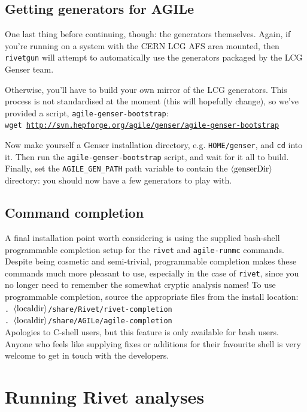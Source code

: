 \documentclass{JHEP3}
\newcommand{\kbd}[1]{\texttt{#1}\xspace}
\newcommand{\inp}[1]{\textsf{\textdollar}\hspace{1mm}\texttt{#1}\xspace}
\newcommand{\var}[1]{\texttt{\textdollar{}#1}\xspace}
\newcommand{\val}[1]{\textit{\ensuremath{\langle\text{\textrm{#1}\/}\rangle}}\xspace}
\begin{document}
\subsection{Getting generators for AGILe}
\label{sec:genser}

One last thing before continuing, though: the generators themselves. Again, if
you're running on a system with the CERN LCG AFS area mounted, then
\kbd{rivetgun} will attempt to automatically use the generators packaged by the
LCG Genser team.

Otherwise, you'll have to build your own mirror of the LCG generators. This
process is not standardised at the moment (this will hopefully
change), so we've provided a script, \kbd{agile-genser-bootstrap}:\\
\inp{wget \url{http://svn.hepforge.org/agile/genser/agile-genser-bootstrap}}

Now make yourself a Genser installation directory, e.g. \kbd{\var{HOME}/genser},
and \kbd{cd} into it. Then run the \kbd{agile-genser-bootstrap} script, and wait
for it all to build. Finally, set the \var{AGILE_GEN_PATH} path variable to
contain the \kbd{\val{genserDir}} directory: you should now have a few
generators to play with.


\subsection{Command completion}

A final installation point worth considering is using the supplied bash-shell
programmable completion setup for the \kbd{rivet} and \kbd{agile-runmc}
commands. Despite being cosmetic and semi-trivial, programmable completion makes
these commands much more pleasant to use, especially in the case of \kbd{rivet},
since you no longer need to remember the somewhat cryptic analysis names! To use
programmable completion, source the appropriate files from the install location:\\
\inp{. \val{localdir}/share/Rivet/rivet-completion}\\
\inp{. \val{localdir}/share/AGILe/agile-completion}\\
Apologies to C-shell users, but this feature is only available for bash
users. Anyone who feels like supplying fixes or additions for their favourite
shell is very welcome to get in touch with the developers.



\section{Running Rivet analyses}
\label{sec:rivetgun}
\end{document}

